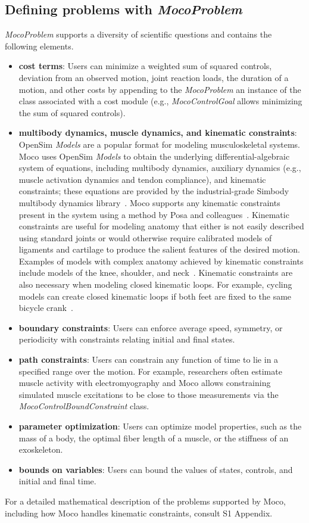 \documentclass[10pt,letterpaper]{article}
\begin{document}
\subsection*{Defining problems with \textit{MocoProblem}}

\textit{MocoProblem} supports a diversity of scientific questions and contains the following elements.
\begin{itemize}
\item \textbf{cost terms}: Users can minimize a weighted sum of squared controls, deviation from an observed motion, joint reaction loads, the duration of a motion, and other costs by appending to the \textit{MocoProblem} an instance of the class associated with a cost module (e.g., \textit{MocoControlGoal} allows minimizing the sum of squared controls).
\item \textbf{multibody dynamics, muscle dynamics, and kinematic constraints}:
OpenSim \textit{Models} are a popular format for modeling musculoskeletal systems. Moco uses OpenSim \textit{Models} to obtain the underlying differential-algebraic system of equations, including multibody dynamics, auxiliary dynamics (e.g., muscle activation dynamics and tendon compliance), and kinematic constraints; these equations are provided by the industrial-grade Simbody multibody dynamics library~\cite{Sherman:2011byc}. Moco supports any kinematic constraints present in the system using a method by Posa and colleagues~\cite{Posa:2016}. Kinematic constraints are useful for modeling anatomy that either is not easily described using standard joints or would otherwise require calibrated models of ligaments and cartilage to produce the salient features of the desired motion. Examples of models with complex anatomy achieved by kinematic constraints include models of the knee, shoulder, and neck~\cite{Seth:2016,Lerner:2015,Rajagopal:2016ek,Cazzola:2017}. Kinematic constraints are also necessary when modeling closed kinematic loops. For example, cycling models can create closed kinematic loops if both feet are fixed to the same bicycle crank~\cite{Jansen:2020}.
\item \textbf{boundary constraints}: Users can enforce average speed, symmetry, or periodicity with constraints relating initial and final states.
\item \textbf{path constraints}: Users can constrain any function of time to lie in a specified range over the motion. For example, researchers often estimate muscle activity with electromyography and Moco allows constraining simulated muscle excitations to be close to those measurements via the \textit{MocoControlBoundConstraint} class.
\item \textbf{parameter optimization}: Users can optimize model properties, such as the mass of a body, the optimal fiber length of a muscle, or the stiffness of an exoskeleton.
\item \textbf{bounds on variables}: Users can bound the values of states, controls, and initial and final time.
\end{itemize}
For a detailed mathematical description of the problems supported by Moco, including how Moco handles kinematic constraints, consult S1 Appendix.
\end{document}
